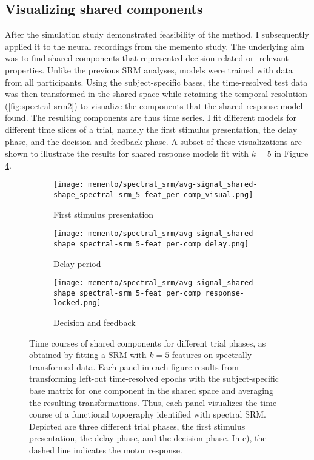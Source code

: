 \pagebreak
\subsection{Visualizing shared components}

After the simulation study demonstrated feasibility of the method, I subsequently applied it to the neural recordings from the memento study.
The underlying aim was to find shared components that represented decision-related or -relevant properties.
Unlike the previous \gls{SRM} analyses, models were trained with data from all participants.
Using the subject-specific bases, the time-resolved test data was then transformed in the shared space while retaining the temporal resolution (\ref{fig:spectral-srm2}) to visualize the components that the shared response model found.
The resulting components are thus time series.
I fit different models for different time slices of a trial, namely the first stimulus presentation, the delay phase, and the decision and feedback phase.
A subset of these visualizations are shown to illustrate the results for shared response models fit with $k = 5$ in Figure \ref{fig:spectral-comps-plain}.


\begin{figure}[H]
	\begin{subfigure}{0.33\textwidth}
		\texttt{[image: memento/spectral\_srm/avg-signal\_shared-shape\_spectral-srm\_5-feat\_per-comp\_visual.png]}
		\caption{First stimulus presentation}
		\label{fig:spectral-comp-visual}
	\end{subfigure}
	\begin{subfigure}{0.33\textwidth}
		\texttt{[image: memento/spectral\_srm/avg-signal\_shared-shape\_spectral-srm\_5-feat\_per-comp\_delay.png]}
		\caption{Delay period}
		\label{fig:spectral-comp-delay}
	\end{subfigure}
	\begin{subfigure}{0.33\textwidth}
		\texttt{[image: memento/spectral\_srm/avg-signal\_shared-shape\_spectral-srm\_5-feat\_per-comp\_response-locked.png]}
		\caption{Decision and feedback}
		\label{fig:spectral-comp-decision}
	\end{subfigure}
	\caption[Shared components for different trial phases]{Time courses of shared components for different trial phases, as obtained by fitting a \gls{SRM} with $k=5$ features on spectrally transformed data. Each panel in each figure results from transforming left-out time-resolved epochs with the subject-specific base matrix for one component in the shared space and averaging the resulting transformations. Thus, each panel visualizes the time course of a functional topography identified with spectral \gls{SRM}. Depicted are three different trial phases, the first stimulus presentation, the delay phase, and the decision phase. In c), the dashed line indicates the motor response.}
	\label{fig:spectral-comps-plain}
\end{figure}


